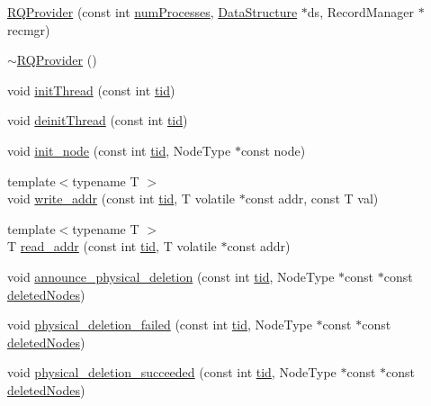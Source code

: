 \begin{DoxyCompactItemize}
\item 
\hyperlink{classRQProvider_a657b85f70daa72353de19671d40bbc22}{R\+Q\+Provider} (const int \hyperlink{testing_8cpp_aa085812188e21ede75351d88b9b2c30d}{num\+Processes}, \hyperlink{classDataStructure}{Data\+Structure} $\ast$ds, Record\+Manager $\ast$recmgr)
\item 
\hyperlink{classRQProvider_aefeec3df4b02ba85843f8dddd0230df8}{$\sim$\+R\+Q\+Provider} ()
\item 
void \hyperlink{classRQProvider_a3485da4cb5f94a1229cd31578b088f85}{init\+Thread} (const int \hyperlink{microbench_2main_8cpp_a9ca9869868fe7e7a38a921cc7de4103f}{tid})
\item 
void \hyperlink{classRQProvider_a3f20b96dfa5a47d9f59ada98e3322695}{deinit\+Thread} (const int \hyperlink{microbench_2main_8cpp_a9ca9869868fe7e7a38a921cc7de4103f}{tid})
\item 
void \hyperlink{classRQProvider_a2cd517d996a170c029435b638c9cf219}{init\+\_\+node} (const int \hyperlink{microbench_2main_8cpp_a9ca9869868fe7e7a38a921cc7de4103f}{tid}, Node\+Type $\ast$const node)
\item 
{\footnotesize template$<$typename T $>$ }\\void \hyperlink{classRQProvider_a2b627a253e65ffdbba9815d0ac3236cb}{write\+\_\+addr} (const int \hyperlink{microbench_2main_8cpp_a9ca9869868fe7e7a38a921cc7de4103f}{tid}, T volatile $\ast$const addr, const T val)
\item 
{\footnotesize template$<$typename T $>$ }\\T \hyperlink{classRQProvider_aa6dcae307b83ce0dc7890155f81659a2}{read\+\_\+addr} (const int \hyperlink{microbench_2main_8cpp_a9ca9869868fe7e7a38a921cc7de4103f}{tid}, T volatile $\ast$const addr)
\item 
void \hyperlink{classRQProvider_a29337e6766144d1c1a9aa752fe73fabf}{announce\+\_\+physical\+\_\+deletion} (const int \hyperlink{microbench_2main_8cpp_a9ca9869868fe7e7a38a921cc7de4103f}{tid}, Node\+Type $\ast$const $\ast$const \hyperlink{scxrecord_8h_ae536bce1bb8c0fffd7a3053f7d258f1e}{deleted\+Nodes})
\item 
void \hyperlink{classRQProvider_a1fb29a074556e0431ed22f2bee394c22}{physical\+\_\+deletion\+\_\+failed} (const int \hyperlink{microbench_2main_8cpp_a9ca9869868fe7e7a38a921cc7de4103f}{tid}, Node\+Type $\ast$const $\ast$const \hyperlink{scxrecord_8h_ae536bce1bb8c0fffd7a3053f7d258f1e}{deleted\+Nodes})
\item 
void \hyperlink{classRQProvider_a1bcce8dc80c1661b549a5ec6f9ee6d15}{physical\+\_\+deletion\+\_\+succeeded} (const int \hyperlink{microbench_2main_8cpp_a9ca9869868fe7e7a38a921cc7de4103f}{tid}, Node\+Type $\ast$const $\ast$const \hyperlink{scxrecord_8h_ae536bce1bb8c0fffd7a3053f7d258f1e}{deleted\+Nodes})

\end{DoxyCompactItemize}
